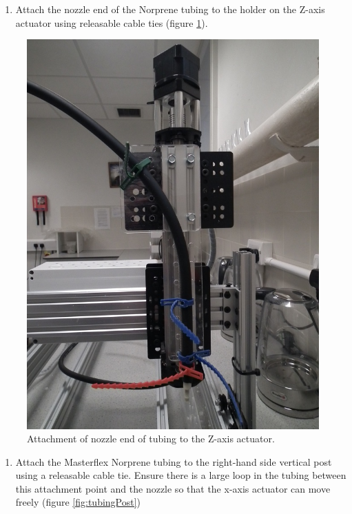 \documentclass[]{book}
\providecommand{\tightlist}{%
  \setlength{\itemsep}{0pt}\setlength{\parskip}{0pt}}
\theoremstyle{definition}
\theoremstyle{definition}
\theoremstyle{definition}
\theoremstyle{remark}
\begin{document}
\begin{enumerate}
\def\labelenumi{\arabic{enumi}.}
\tightlist
\item
  Attach the nozzle end of the Norprene tubing to the holder on the
  Z-axis actuator using releasable cable ties (figure
  \ref{fig:attachNozzle}).
\end{enumerate}

\begin{figure}

{\centering \includegraphics[width=0.75\linewidth]{images/pump4} 

}

\caption{Attachment of nozzle end of tubing to the Z-axis actuator.}\label{fig:attachNozzle}
\end{figure}

\begin{enumerate}
\def\labelenumi{\arabic{enumi}.}
\setcounter{enumi}{1}
\tightlist
\item
  Attach the Masterflex Norprene tubing to the right-hand side vertical
  post using a releasable cable tie. Ensure there is a large loop in the
  tubing between this attachment point and the nozzle so that the x-axis
  actuator can move freely (figure \ref{fig:tubingPost})
\end{enumerate}
\end{document}
